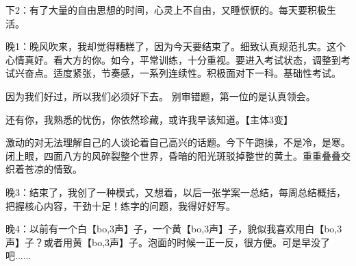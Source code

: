 \documentclass[UTF8]{book}
\begin{document}
下2：有了大量的自由思想的时间，心灵上不自由，又睡恹恹的。每天要积极生活。

晚1：晚风吹来，我却觉得糟糕了，因为今天要结束了。细致认真规范扎实。这个心情真好。看大方的你。如今，平常训练，十分重视。要进入考试状态，调整到考试兴奋点。适度紧张，节奏感，一系列连续性。积极面对下一科。基础性考试。

因为我们好过，所以我们必须好下去。
别审错题，第一位的是认真领会。

还有你，我熟悉的忧伤，你依然珍藏，或许我早该知道。【主体3变】

激动的对无法理解自己的人谈论着自己高兴的话题。今下午跑操，不是冷，是寒。闭上眼，四面八方的风碎裂整个世界，昏暗的阳光斑驳掉整世的黄土。重重叠叠交织着苍凉的情致。

晚3：结束了，我创了一种模式，又想着，以后一张学案一总结，每周总结概括，把握核心内容，干劲十足！练字的问题，我得好好写。

晚4：以前有一个白【bo,3声】子，一个黄【bo,3声】子，貌似我喜欢用白【bo,3声】子？或者用黄【bo,3声】子。泡面的时候一正一反，很方便。可是早没了吧......
\end{document}
